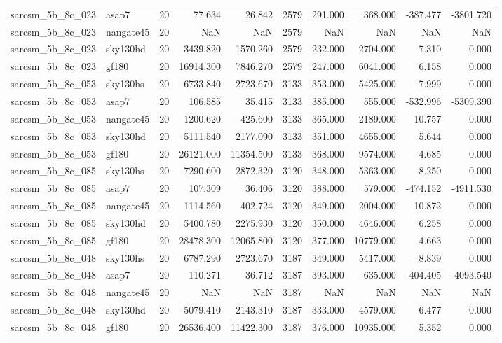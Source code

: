 \begin{longtable}{llrrrrrrrr}
sarcsm\_5b\_8c\_023 & asap7 & 20 & 77.634 & 26.842 & 2579 & 291.000 & 368.000 & -387.477 & -3801.720 \\
sarcsm\_5b\_8c\_023 & nangate45 & 20 & NaN & NaN & 2579 & NaN & NaN & NaN & NaN \\
sarcsm\_5b\_8c\_023 & sky130hd & 20 & 3439.820 & 1570.260 & 2579 & 232.000 & 2704.000 & 7.310 & 0.000 \\
sarcsm\_5b\_8c\_023 & gf180 & 20 & 16914.300 & 7846.270 & 2579 & 247.000 & 6041.000 & 6.158 & 0.000 \\
sarcsm\_5b\_8c\_053 & sky130hs & 20 & 6733.840 & 2723.670 & 3133 & 353.000 & 5425.000 & 7.999 & 0.000 \\
sarcsm\_5b\_8c\_053 & asap7 & 20 & 106.585 & 35.415 & 3133 & 385.000 & 555.000 & -532.996 & -5309.390 \\
sarcsm\_5b\_8c\_053 & nangate45 & 20 & 1200.620 & 425.600 & 3133 & 365.000 & 2189.000 & 10.757 & 0.000 \\
sarcsm\_5b\_8c\_053 & sky130hd & 20 & 5111.540 & 2177.090 & 3133 & 351.000 & 4655.000 & 5.644 & 0.000 \\
sarcsm\_5b\_8c\_053 & gf180 & 20 & 26121.000 & 11354.500 & 3133 & 368.000 & 9574.000 & 4.685 & 0.000 \\
sarcsm\_5b\_8c\_085 & sky130hs & 20 & 7290.600 & 2872.320 & 3120 & 348.000 & 5363.000 & 8.250 & 0.000 \\
sarcsm\_5b\_8c\_085 & asap7 & 20 & 107.309 & 36.406 & 3120 & 388.000 & 579.000 & -474.152 & -4911.530 \\
sarcsm\_5b\_8c\_085 & nangate45 & 20 & 1114.560 & 402.724 & 3120 & 349.000 & 2004.000 & 10.872 & 0.000 \\
sarcsm\_5b\_8c\_085 & sky130hd & 20 & 5400.780 & 2275.930 & 3120 & 350.000 & 4646.000 & 6.258 & 0.000 \\
sarcsm\_5b\_8c\_085 & gf180 & 20 & 28478.300 & 12065.800 & 3120 & 377.000 & 10779.000 & 4.663 & 0.000 \\
sarcsm\_5b\_8c\_048 & sky130hs & 20 & 6787.290 & 2723.670 & 3187 & 349.000 & 5417.000 & 8.839 & 0.000 \\
sarcsm\_5b\_8c\_048 & asap7 & 20 & 110.271 & 36.712 & 3187 & 393.000 & 635.000 & -404.405 & -4093.540 \\
sarcsm\_5b\_8c\_048 & nangate45 & 20 & NaN & NaN & 3187 & NaN & NaN & NaN & NaN \\
sarcsm\_5b\_8c\_048 & sky130hd & 20 & 5079.410 & 2143.310 & 3187 & 333.000 & 4579.000 & 6.477 & 0.000 \\
sarcsm\_5b\_8c\_048 & gf180 & 20 & 26536.400 & 11422.300 & 3187 & 376.000 & 10935.000 & 5.352 & 0.000 \\

\end{longtable}
